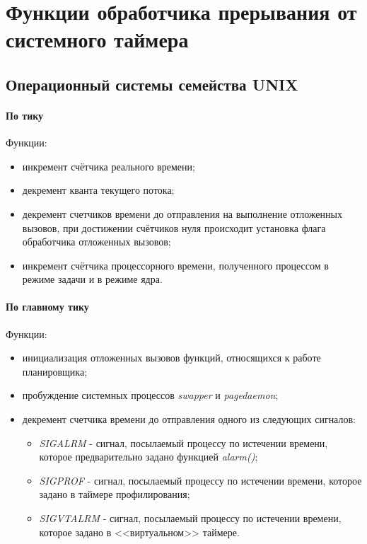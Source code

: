 \chapter{Функции обработчика прерывания от системного таймера}

\section{Операционный системы семейства UNIX}

\subsubsection{По тику}

Функции:
\begin{itemize}
	\item инкремент счётчика реального времени;
	\item декремент кванта текущего потока;
	\item декремент счетчиков времени до отправления на выполнение отложенных вызовов, при достижении счётчиков нуля происходит установка флага обработчика отложенных вызовов;
	\item инкремент счётчика процессорного времени, полученного процессом в режиме задачи и в режиме ядра.
\end{itemize}

\subsubsection{По главному тику}

Функции:
\begin{itemize}
	\item инициализация отложенных вызовов функций, относящихся к работе планировщика;
	\item пробуждение системных процессов \textit{swapper} и \textit{pagedaemon};
	\item декремент счетчика времени до отправления одного из следующих сигналов:
	\begin{itemize}
		\item \textit{SIGALRM} - сигнал, посылаемый процессу по истечении времени, которое предварительно задано функцией \textit{alarm()};
		\item \textit{SIGPROF} - сигнал, посылаемый процессу по истечении времени, которое задано в таймере профилирования;
		\item \textit{SIGVTALRM} - сигнал, посылаемый процессу по истечении времени, которое задано в <<виртуальном>> таймере.
	\end{itemize}
\end{itemize}

